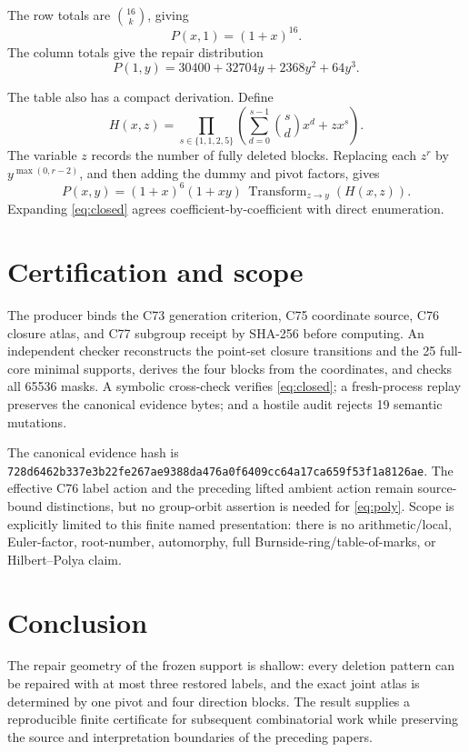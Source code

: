 \documentclass[10pt]{article}
\begin{document}
The row totals are $\binom{16}{k}$, giving
\[
 P(x,1)=(1+x)^{16}.
\]
The column totals give the repair distribution
\[
 P(1,y)=30400+32704y+2368y^2+64y^3.
\]

The table also has a compact derivation.  Define
\begin{equation}
 H(x,z)=\prod_{s\in\{1,1,2,5\}}
 \left(\sum_{d=0}^{s-1}\binom{s}{d}x^d+zx^s\right).
\label{eq:H}
\end{equation}
The variable $z$ records the number of fully deleted blocks.  Replacing each
$z^r$ by $y^{\max(0,r-2)}$, and then adding the dummy and pivot factors, gives
\begin{equation}
 P(x,y)=(1+x)^6(1+xy)\,\operatorname{Transform}_{z\to y}(H(x,z)).
 \label{eq:closed}
\end{equation}
Expanding \eqref{eq:closed} agrees coefficient-by-coefficient with direct
enumeration.

\section{Certification and scope}
The producer binds the C73 generation criterion, C75 coordinate source, C76
closure atlas, and C77 subgroup receipt by SHA-256 before computing.  An independent checker
reconstructs the point-set closure transitions and the 25 full-core minimal
supports, derives the four blocks from the coordinates, and checks all 65536
masks.  A symbolic cross-check verifies \eqref{eq:closed}; a fresh-process
replay preserves the canonical evidence bytes; and a hostile audit rejects
19 semantic mutations.

The canonical evidence hash is
\texttt{728d6462b337e3b22fe267ae9388da476a0f6409cc64a17ca659f53f1a8126ae}.
The effective C76 label action and the preceding lifted ambient action remain
source-bound distinctions, but no group-orbit assertion is needed for
\eqref{eq:poly}.  Scope is explicitly limited to this finite named
presentation: there is no arithmetic/local, Euler-factor, root-number,
automorphy, full Burnside-ring/table-of-marks, or Hilbert--Polya claim.

\section{Conclusion}
The repair geometry of the frozen support is shallow: every deletion pattern
can be repaired with at most three restored labels, and the exact joint atlas
is determined by one pivot and four direction blocks.  The result supplies a
reproducible finite certificate for subsequent combinatorial work while
preserving the source and interpretation boundaries of the preceding papers.
\end{document}
